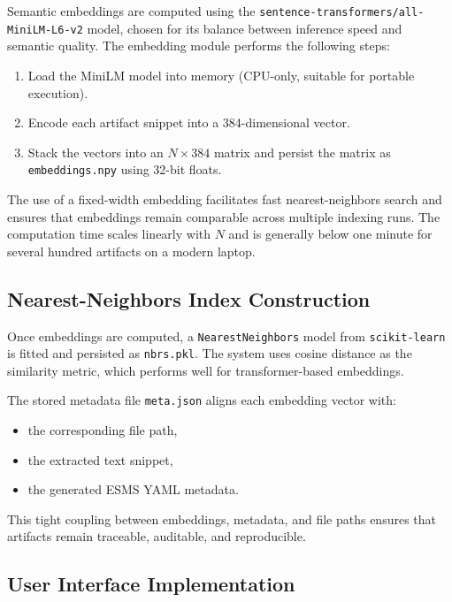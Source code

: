\documentclass[12pt]{article}
\begin{document}
Semantic embeddings are computed using the 
\texttt{sentence-transformers/all-MiniLM-L6-v2} model, chosen for its balance 
between inference speed and semantic quality. The embedding module performs the 
following steps:

\begin{enumerate}
    \item Load the MiniLM model into memory (CPU-only, suitable for portable 
    execution).
    \item Encode each artifact snippet into a 384-dimensional vector.
    \item Stack the vectors into an $N \times 384$ matrix and persist the matrix 
    as \texttt{embeddings.npy} using 32-bit floats.
\end{enumerate}

The use of a fixed-width embedding facilitates fast nearest-neighbors search 
and ensures that embeddings remain comparable across multiple indexing runs. 
The computation time scales linearly with $N$ and is generally below one minute 
for several hundred artifacts on a modern laptop.

\subsection{Nearest-Neighbors Index Construction}

Once embeddings are computed, a \texttt{NearestNeighbors} model from 
\texttt{scikit-learn} is fitted and persisted as \texttt{nbrs.pkl}. The system 
uses cosine distance as the similarity metric, which performs well for 
transformer-based embeddings.

The stored metadata file \texttt{meta.json} aligns each embedding vector with:

\begin{itemize}
    \item the corresponding file path,
    \item the extracted text snippet,
    \item the generated ESMS YAML metadata.
\end{itemize}

This tight coupling between embeddings, metadata, and file paths ensures that 
artifacts remain traceable, auditable, and reproducible.

\subsection{User Interface Implementation}
\end{document}
